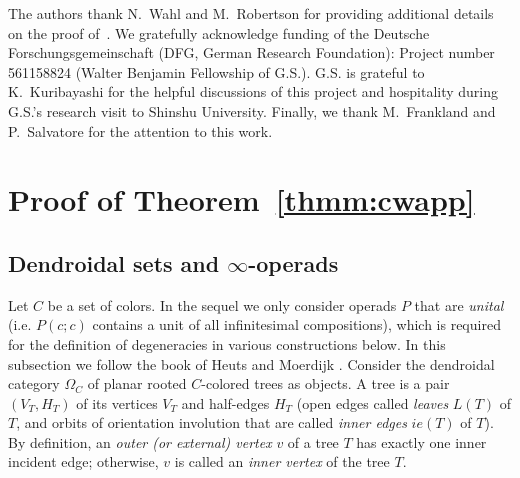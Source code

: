 \documentclass{amsart}
\theoremstyle{definition}
\theoremstyle{remark}
\begin{document}
	
	The authors thank N.~Wahl and M.~Robertson for providing additional details on the proof of~\cite[Theorem B.6]{clrrw-22}. 
	We gratefully acknowledge funding of the Deutsche Forschungsgemeinschaft
	(DFG, German Research Foundation): Project number 561158824 (Walter Benjamin Fellowship of G.S.).
    G.S. is grateful to K.~Kuribayashi for the helpful discussions of this project and hospitality during G.S.'s research visit to Shinshu University.
    Finally, we thank M.~Frankland and P.~Salvatore for the attention to this work.
	

	\section{Proof of Theorem~\ref{thmm:cwapp}}\label{sec:thm1}

	\subsection{Dendroidal sets and $\infty$-operads}\label{ssec:dset}

    Let $C$ be a set of colors.	
	In the sequel we only consider operads $P$ that are \textit{unital} (i.e. $P(c;c)$ contains a unit of all infinitesimal compositions), which is required for the definition of degeneracies in various constructions below.
	In this subsection we follow the book of Heuts and Moerdijk \cite{he-mo-22}.
	Consider the dendroidal category $\Omega_{C}$ of planar rooted $C$-colored trees as objects.
	A tree is a pair $(V_T, H_T)$ of its vertices $V_T$ and half-edges $H_T$ (open edges called \emph{leaves} $L(T)$ of $T$, and orbits of orientation involution that are called \emph{inner edges} $ie(T)$ of $T$).
	By definition, an \textit{outer (or external) vertex} $v$ of a tree $T$ has exactly one inner incident edge; otherwise, $v$ is called an \textit{inner vertex} of the tree $T$.
	
\end{document}
